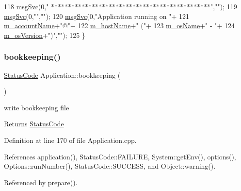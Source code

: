 \begin{DoxyCode}
118   \hyperlink{classObject_a3f9d5537ebce0c0f2bf6ae4d92426f3c}{msgSvc}(0,\textcolor{stringliteral}{"                          ***********************************************"},\textcolor{stringliteral}{""});
119   \hyperlink{classObject_a3f9d5537ebce0c0f2bf6ae4d92426f3c}{msgSvc}(0,\textcolor{stringliteral}{""},\textcolor{stringliteral}{""});
120   \hyperlink{classObject_a3f9d5537ebce0c0f2bf6ae4d92426f3c}{msgSvc}(0,\textcolor{stringliteral}{"Application running on "}+
121      \hyperlink{classApplication_ac6ecd97be07092147986a7a5965c54ec}{m\_accountName}+\textcolor{stringliteral}{"@"}+
122      \hyperlink{classApplication_a20094c2bf311e2046942eeeec4a11f02}{m\_hostName}+\textcolor{stringliteral}{" ("}+
123      \hyperlink{classApplication_a59f90c6ff4ee3db646ca656c71cc77e7}{m\_osName}+\textcolor{stringliteral}{" - "}+
124      \hyperlink{classApplication_a17949f767d2598e92acb0885bb399dc0}{m\_osVersion}+\textcolor{stringliteral}{")"},\textcolor{stringliteral}{""});
125 \}
\end{DoxyCode}
\mbox{\label{classApplication_ad5faa0fa744706190844bbc4be58b700}} 
\subsubsection{\texorpdfstring{bookkeeping()}{bookkeeping()}}
{\footnotesize\ttfamily \hyperlink{classStatusCode}{Status\+Code} Application\+::bookkeeping (\begin{DoxyParamCaption}{ }\end{DoxyParamCaption})}

write bookkeeping file \begin{DoxyReturn}{Returns}
\hyperlink{classStatusCode}{Status\+Code} 
\end{DoxyReturn}


Definition at line 170 of file Application.\+cpp.



References application(), Status\+Code\+::\+F\+A\+I\+L\+U\+RE, System\+::get\+Env(), options(), Options\+::run\+Number(), Status\+Code\+::\+S\+U\+C\+C\+E\+SS, and Object\+::warning().



Referenced by prepare().


